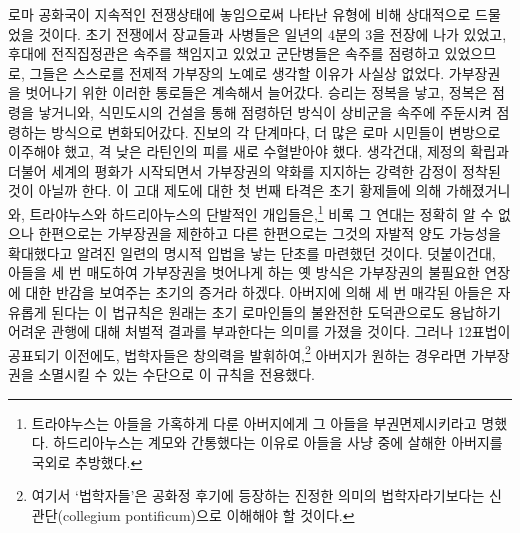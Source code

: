 로마 공화국이 지속적인 전쟁상태에 놓임으로써 나타난 유형에 비해
상대적으로 드물었을 것이다.
초기 전쟁에서 장교들과 사병들은 일년의 4분의 3을 전장에 나가 있었고,
후대에 전직집정관은 속주를 책임지고 있었고
군단병들은 속주를 점령하고 있었으므로,
그들은 스스로를 전제적 가부장의 노예로 생각할 이유가 사실상 없었다.
가부장권을 벗어나기 위한 이러한 통로들은 계속해서 늘어갔다.
승리는 정복을 낳고, 정복은 점령을 낳거니와,
식민도시의 건설을 통해 점령하던 방식이
상비군을 속주에 주둔시켜 점령하는 방식으로
변화되어갔다.
진보의 각 단계마다,
더 많은 로마 시민들이 변방으로 이주해야 했고,
격 낮은 라틴인의 피를 새로 수혈받아야 했다.
생각건대,
제정의 확립과 더불어 세계의 평화가 시작되면서
가부장권의 약화를 지지하는 강력한 감정이 정착된 것이 아닐까 한다.
이 고대 제도에 대한 첫 번째 타격은 초기 황제들에 의해 가해졌거니와,
트라야누스와 하드리아누스의 단발적인 개입들은,\footnote{트라야누스는
아들을 가혹하게 다룬 아버지에게 그 아들을 부권면제시키라고 명했다.
하드리아누스는 계모와 간통했다는 이유로 아들을 사냥 중에 살해한 아버지를
국외로 추방했다.}
비록 그 연대는 정확히 알 수 없으나
한편으로는 가부장권을 제한하고
다른 한편으로는 그것의 자발적 양도 가능성을 확대했다고 알려진
일련의 명시적 입법을 낳는 단초를 마련했던 것이다.
덧붙이건대, 아들을 세 번 매도하여 가부장권을 벗어나게 하는 옛 방식은
가부장권의 불필요한 연장에 대한 반감을 보여주는
초기의 증거라 하겠다.
아버지에 의해 세 번 매각된 아들은 자유롭게 된다는 이 법규칙은
원래는
초기 로마인들의 불완전한 도덕관으로도
용납하기 어려운 관행에 대해 처벌적 결과를 부과한다는 의미를 가졌을 것이다.
그러나 12표법이 공표되기 이전에도,
법학자들은 창의력을 발휘하여,\footnote{여기서 `법학자들'은
공화정 후기에 등장하는 진정한 의미의 법학자라기보다는
신관단(collegium pontificum)으로 이해해야 할 것이다.}
아버지가 원하는 경우라면 가부장권을 소멸시킬 수 있는 수단으로
이 규칙을 전용했다.

